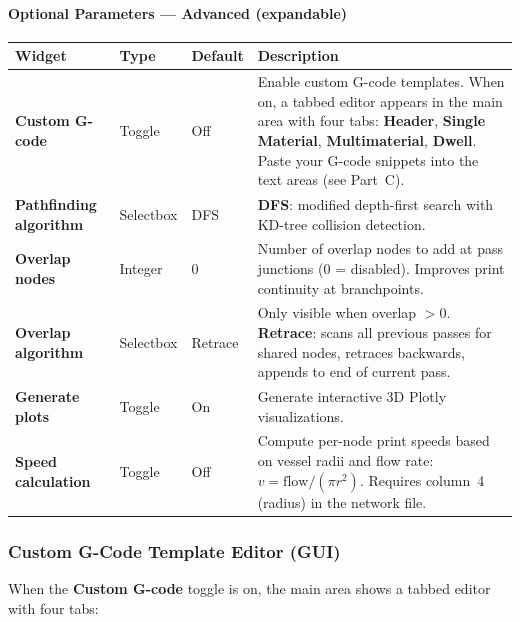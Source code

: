 \documentclass[11pt,letterpaper]{article}
\newcommand{\gui}[1]{\textcolor{guicolor}{\textsf{\textbf{#1}}}}
\begin{document}
\paragraph{Optional Parameters --- Advanced (expandable)}

\begin{longtable}{@{}L{3.5cm} l l L{5cm}@{}}
\toprule
\textbf{Widget} & \textbf{Type} & \textbf{Default} & \textbf{Description} \\
\midrule
\gui{Custom G-code} & Toggle & Off & Enable custom G-code templates. When on, a tabbed editor appears in the main area with four tabs: \textbf{Header}, \textbf{Single Material}, \textbf{Multimaterial}, \textbf{Dwell}. Paste your G-code snippets into the text areas (see Part~C). \\
\gui{Pathfinding algorithm} & Selectbox & DFS & \textbf{DFS}: modified depth-first search with KD-tree collision detection. \\
\gui{Overlap nodes} & Integer & 0 & Number of overlap nodes to add at pass junctions (0 = disabled). Improves print continuity at branchpoints. \\
\gui{Overlap algorithm} & Selectbox & Retrace & Only visible when overlap $> 0$. \textbf{Retrace}: scans all previous passes for shared nodes, retraces backwards, appends to end of current pass. \\
\gui{Generate plots} & Toggle & On & Generate interactive 3D Plotly visualizations. \\
\gui{Speed calculation} & Toggle & Off & Compute per-node print speeds based on vessel radii and flow rate: $v = \text{flow} / (\pi r^2)$. Requires column~4 (radius) in the network file. \\
\bottomrule
\end{longtable}

\subsubsection{Custom G-Code Template Editor (GUI)}

When the \gui{Custom G-code} toggle is on, the main area shows a tabbed editor with four tabs:
\end{document}

